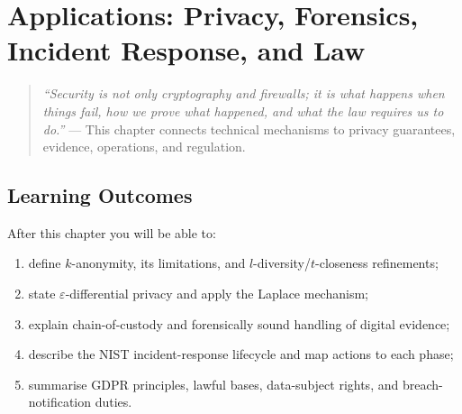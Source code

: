 \chapter{Applications: Privacy, Forensics, Incident Response, and Law}
\label{ch:applications}
\begin{quote}
\emph{``Security is not only cryptography and firewalls; it is what happens when things fail, how we prove what happened, and what the law requires us to do.''} --- This chapter connects technical mechanisms to privacy guarantees, evidence, operations, and regulation.
\end{quote}
\noindent{}
\vspace{0.4em}
\section*{Learning Outcomes}
After this chapter you will be able to:
\begin{enumerate}[label=(L\arabic*)]
    \item define $k$-anonymity, its limitations, and $l$-diversity/$t$-closeness refinements;
    \item state $\varepsilon$-differential privacy and apply the Laplace mechanism;
    \item explain chain-of-custody and forensically sound handling of digital evidence;
    \item describe the NIST incident-response lifecycle and map actions to each phase;
    \item summarise GDPR principles, lawful bases, data-subject rights, and breach-notification duties.
\end{enumerate}
